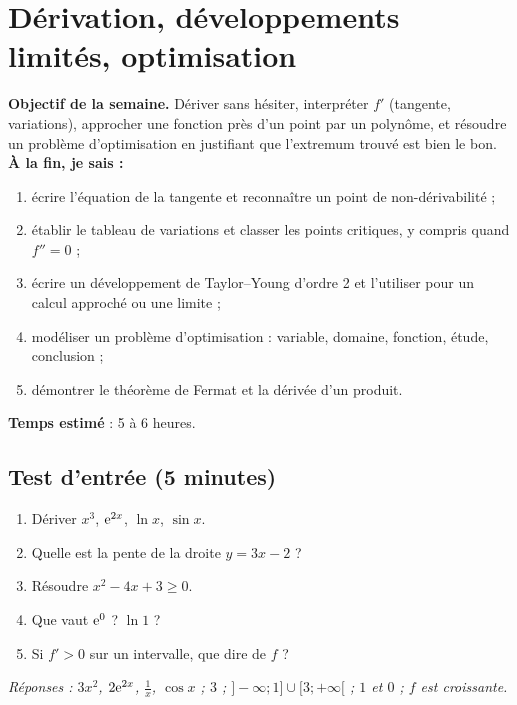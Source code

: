 \clearpage
\section{Dérivation, développements limités, optimisation}
\renewcommand{\titrecourant}{Semaine 3}

\begin{boussole}
\textbf{Objectif de la semaine.} Dériver sans hésiter, interpréter $f'$ (tangente, variations), approcher une fonction près d'un point par un polynôme, et résoudre un problème d'optimisation en justifiant que l'extremum trouvé est bien le bon.\\
\textbf{À la fin, je sais :}
\begin{enumerate}
 \item écrire l'équation de la tangente et reconnaître un point de non-dérivabilité ;
 \item établir le tableau de variations et classer les points critiques, y compris quand $f''=0$ ;
 \item écrire un développement de Taylor--Young d'ordre 2 et l'utiliser pour un calcul approché ou une limite ;
 \item modéliser un problème d'optimisation : variable, domaine, fonction, étude, conclusion ;
 \item démontrer le théorème de Fermat et la dérivée d'un produit.
\end{enumerate}
\textbf{Temps estimé} : 5 à 6 heures.
\end{boussole}

\subsection{Test d'entrée (5 minutes)}
\begin{enumerate}
 \item Dériver $x^3$, $\mathrm{e}^{2x}$, $\ln x$, $\sin x$.
 \item Quelle est la pente de la droite $y=3x-2$ ?
 \item Résoudre $x^2-4x+3\ge0$.
 \item Que vaut $\mathrm{e}^0$ ? $\ln 1$ ?
 \item Si $f'>0$ sur un intervalle, que dire de $f$ ?
\end{enumerate}
\textit{Réponses : $3x^2$, $2\mathrm{e}^{2x}$, $\frac1x$, $\cos x$ ; $3$ ; $]-\infty;1]\cup[3;+\infty[$ ; $1$ et $0$ ; $f$ est croissante.}

